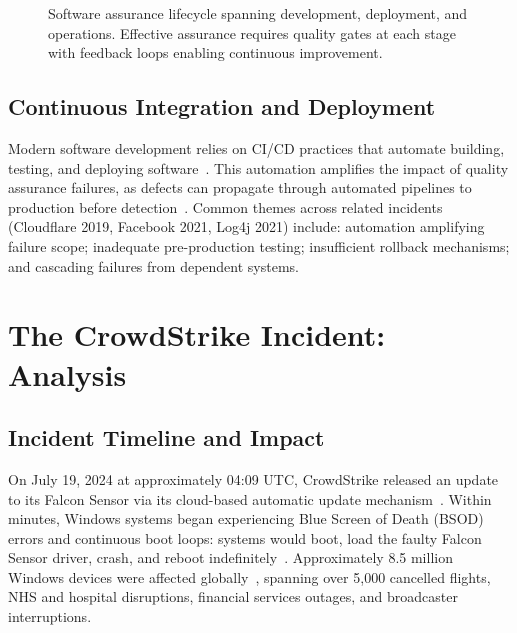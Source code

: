 \documentclass[sigconf,nonacm]{acmart}
\begin{document}
\begin{figure}[t]
\caption{Software assurance lifecycle spanning development, deployment, and operations.
  Effective assurance requires quality gates at each stage with feedback loops enabling
  continuous improvement.}
\label{fig:lifecycle}
\end{figure}
\subsection{Continuous Integration and Deployment}

Modern software development relies on CI/CD practices that automate building, testing, and
deploying software~\cite{shahin2021continuous}. This automation amplifies the impact of
quality assurance failures, as defects can propagate through automated pipelines to
production before detection~\cite{forsgren2021accelerate}. Common themes across related
incidents (Cloudflare 2019, Facebook 2021, Log4j 2021) include: automation amplifying
failure scope; inadequate pre-production testing; insufficient rollback mechanisms; and
cascading failures from dependent systems.

\section{The CrowdStrike Incident: Analysis}

\subsection{Incident Timeline and Impact}

On July 19, 2024 at approximately 04:09 UTC, CrowdStrike released an update to its Falcon
Sensor via its cloud-based automatic update mechanism~\cite{crowdstrike2024incident}. Within
minutes, Windows systems began experiencing Blue Screen of Death (BSOD) errors and
continuous boot loops: systems would boot, load the faulty Falcon Sensor driver, crash, and
reboot indefinitely~\cite{plummer2024crowdstrike}. Approximately 8.5 million Windows devices
were affected globally~\cite{microsoft2024crowdstrike}, spanning over 5,000 cancelled
flights, NHS and hospital disruptions, financial services outages, and broadcaster
interruptions.
\end{document}
